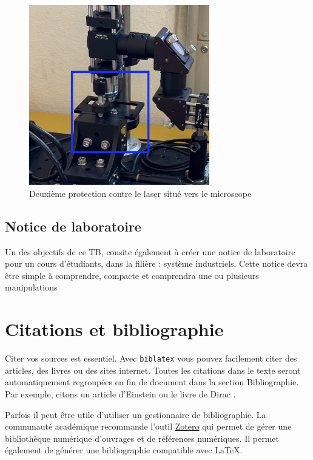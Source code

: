 \begin{figure}[H]
    \begin{center}
        \includegraphics[width=0.7\textwidth]{assets/figures/figures_introduction/protection_fin_laser.jpeg}
    \end{center}
    \caption{Deuxième protection contre le laser situé vers le microscope}
    \label{protection_laser_fin}
\end{figure}

\subsection{Notice de laboratoire}

Un des objectifs de ce TB, consite également à créer une notice de laboratoire pour un cours d'étudiants, dans la filière : système industriels. Cette notice devra être simple à comprendre, compacte et comprendra une ou plusieurs manipulations





\section{Citations et bibliographie}
Citer vos sources est essentiel. Avec \texttt{biblatex} vous pouvez facilement citer des articles, des livres ou des sites internet. Toutes les citations dans le texte seront automatiquement regroupées en fin de document dans la section \guillemotleft Bibliographie\guillemotright. Par exemple, citons un article d'Einstein \cite{einstein} ou le livre de Dirac \cite{dirac}.

Parfois il peut être utile d'utiliser un gestionnaire de bibliographie. La communauté académique recommande l'outil \href{https://www.zotero.org/}{Zotero} qui permet de gérer une bibliothèque numérique d'ouvrages et de références numériques. Il permet également de générer une bibliographie compatible avec \LaTeX.

